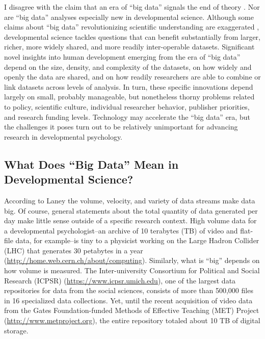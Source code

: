 \documentclass[letterpaper,man,apacite,natbib]{apa6}
\begin{document}
I disagree with the claim that an era of ``big data'' signals the end of theory \cite{anderson_end_2008}.
Nor are ``big data'' analyses especially new in developmental science.
Although some claims about ``big data'' revolutionizing scientific understanding are exaggerated \cite{boyd_critical_2012}, developmental science tackles questions that can benefit substantially from larger, richer, more widely shared, and more readily inter-operable datasets.
Significant novel insights into human development emerging from the era of ``big data'' depend on the size, density, and complexity of the datasets, on how widely and openly the data are shared, and on how readily researchers are able to combine or link datasets across levels of analysis.
In turn, these specific innovations depend largely on small, probably manageable, but nonetheless thorny problems related to policy, scientific culture, individual researcher behavior, publisher priorities, and research funding levels.
Technology may accelerate the ``big data'' era, but the challenges it poses turn out to be relatively unimportant for advancing research in developmental psychology.

\subsection{What Does ``Big Data'' Mean in Developmental Science?}

According to Laney \citeyear{laney01controlling3v} the volume, velocity, and variety of data streams make data big.
Of course, general statements about the total quantity of data generated per day \cite{ibm_2015} make little sense outside of a specific research context.
High volume data for a developmental psychologist--an archive of 10 terabytes (TB) of video and flat-file data, for example--is tiny to a physicist working on the Large Hadron Collider (LHC) that generates 30 petabytes in a year (\url{http://home.web.cern.ch/about/computing}).
Similarly, what is ``big'' depends on how volume is measured.
The Inter-university Consortium for Political and Social Research (ICPSR) (\url{https://www.icpsr.umich.edu}), one of the largest data repositories for data from the social sciences, consists of more than 500,000 files in 16 specialized data collections.
Yet, until the recent acquisition of video data from the Gates Foundation-funded Methods of Effective Teaching (MET) Project (\url{http://www.metproject.org}), the entire repository totaled about 10 TB of digital storage.
\end{document}

